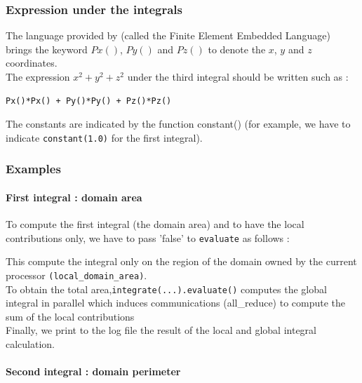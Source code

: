 \subsubsection{Expression under the integrals}

The language provided by \feel (called the Finite Element Embedded Language) brings the keyword $Px()$, $Py()$ and $Pz()$ to denote the $x$, $y$ and $z$ coordinates. \\
The expression $x^2 + y^2 + z^2$ under the third integral should be written such as :
\begin{lstlisting}
Px()*Px() + Py()*Py() + Pz()*Pz()
\end{lstlisting}
\vspace{0.2cm}
The constants are indicated by the function constant() (for example, we have to indicate \lstinline!constant(1.0)! for the first integral). \\

\subsubsection{Examples}

\paragraph{First integral : domain area \\}
To compute the first integral (the domain area) and to have the local contributions only, we have to pass 'false' to \lstinline!evaluate! as follows :



This compute the integral only on the region of the domain owned by the current processor \lstinline!(local_domain_area)!. \\

To obtain the total area,\lstinline!integrate(...).evaluate()! computes the global integral in parallel which induces communications (all\_reduce) to compute the sum of the local contributions \\


\vspace{0.2cm}
Finally, we print to the log file the result of the local and global integral calculation.


\paragraph{Second integral : domain perimeter \\}

